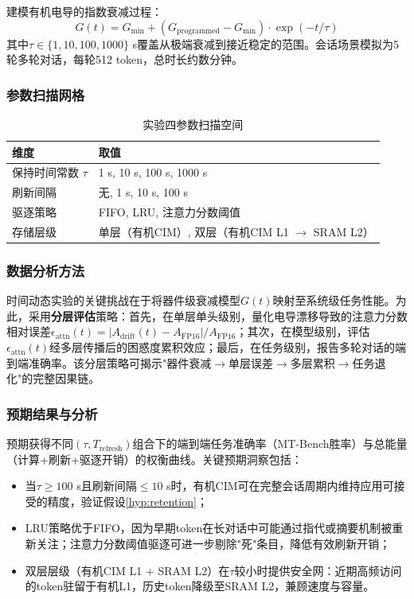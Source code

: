 建模有机电导的指数衰减过程：
\begin{equation}
G(t) = G_{\min} + (G_{\text{programmed}} - G_{\min}) \cdot \exp(-t / \tau)
\label{eq:retention_decay}
\end{equation}
其中$\tau \in \{1, 10, 100, 1000\}$ s覆盖从极端衰减到接近稳定的范围。会话场景模拟为5轮多轮对话，每轮512 token，总时长约数分钟。

\subsubsection{参数扫描网格}

\begin{table}[htbp]
\centering
\caption{实验四参数扫描空间}
\label{tab:exp4_grid}
\begin{tabular}{ll}
\toprule
维度 & 取值 \\
\midrule
保持时间常数 $\tau$ & 1 s, 10 s, 100 s, 1000 s \\
刷新间隔 & 无, 1 s, 10 s, 100 s \\
驱逐策略 & FIFO, LRU, 注意力分数阈值 \\
存储层级 & 单层（有机CIM）, 双层（有机CIM L1 $\rightarrow$ SRAM L2） \\
\bottomrule
\end{tabular}
\end{table}

\subsubsection{数据分析方法}

时间动态实验的关键挑战在于将器件级衰减模型$G(t)$映射至系统级任务性能。为此，采用\textbf{分层评估}策略：首先，在单层单头级别，量化电导漂移导致的注意力分数相对误差$\epsilon_{\text{attn}}(t) = |A_{\text{drift}}(t) - A_{\text{FP16}}| / A_{\text{FP16}}$；其次，在模型级别，评估$\epsilon_{\text{attn}}(t)$经多层传播后的困惑度累积效应；最后，在任务级别，报告多轮对话的端到端准确率。该分层策略可揭示"器件衰减$\rightarrow$单层误差$\rightarrow$多层累积$\rightarrow$任务退化"的完整因果链。

\subsubsection{预期结果与分析}

预期获得不同$(\tau, T_{\text{refresh}})$组合下的端到端任务准确率（MT-Bench胜率）与总能量（计算+刷新+驱逐开销）的权衡曲线。关键预期洞察包括：

\begin{itemize}
    \item 当$\tau \geq 100$ s且刷新间隔$\leq 10$ s时，有机CIM可在完整会话周期内维持应用可接受的精度，验证假设\ref{hyp:retention}；
    \item LRU策略优于FIFO，因为早期token在长对话中可能通过指代或摘要机制被重新关注；注意力分数阈值驱逐可进一步剔除"死"条目，降低有效刷新开销；
    \item 双层层级（有机CIM L1 + SRAM L2）在$\tau$较小时提供安全网：近期高频访问的token驻留于有机L1，历史token降级至SRAM L2，兼顾速度与容量。
\end{itemize}


